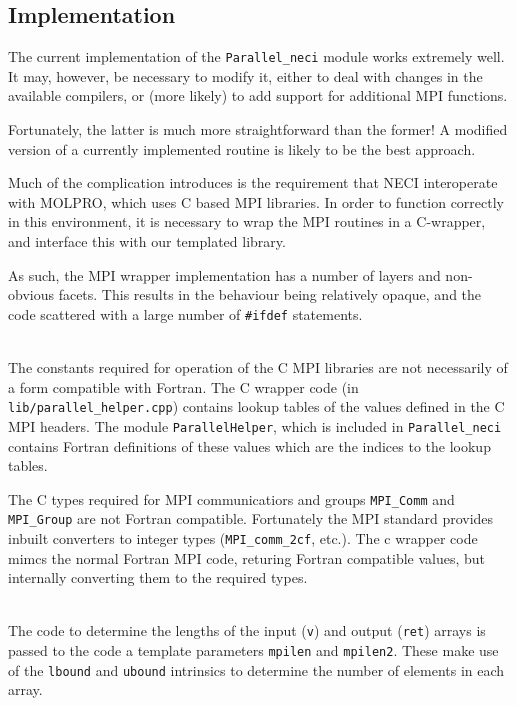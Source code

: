 \documentclass[a4paper,notitlepage]{scrreprt}
\newcommand\headitem[1]{\needspace{1.5\baselineskip}\item[{\boldmath #1 \nopagebreak}] \hfill \\ \nopagebreak}
\let\code\lstinline
\begin{document}
{{{\subsection{Implementation}
	The current implementation of the \code{Parallel_neci} module works
	extremely well. It may, however, be necessary to modify it, either to
	deal with changes in the available compilers, or (more likely) to add
	support for additional MPI functions.

	Fortunately, the latter is much more straightforward than the former!
	A modified version of a currently implemented routine is likely to be
	the best approach.

	Much of the complication introduces is the requirement that NECI
	interoperate with MOLPRO, which uses C based MPI libraries. In order
	to function correctly in this environment, it is necessary to wrap
	the MPI routines in a C-wrapper, and interface this with our
	templated library.

	As such, the MPI wrapper implementation has a number of layers and
	non-obvious facets. This results in the behaviour being relatively
	opaque, and the code scattered with a large number of \code{#ifdef}
	statements.
	\begin{description}
		\headitem{C-wrapper initialisation}
			The constants required for operation of the C MPI
			libraries are not necessarily of a form compatible with
			Fortran. The C wrapper code (in
			\code{lib/parallel_helper.cpp}) contains lookup tables of
			the values defined in the C MPI headers. The module
			\code{ParallelHelper}, which is included in
			\code{Parallel_neci} contains Fortran definitions of these
			values which are the indices to the lookup tables.

			The C types required for MPI communicatiors and groups
			\code{MPI_Comm} and \code{MPI_Group} are not Fortran
			compatible. Fortunately the MPI standard provides inbuilt
			converters to integer types (\code{MPI_comm_2cf}, etc.).
			The c wrapper code mimcs the normal Fortran MPI
			code, returing Fortran compatible values, but internally
			converting them to the required types.


		\headitem{Determination of parameter sizes}
			The code to determine the lengths of the input (\code{v})
			and output (\code{ret}) arrays is passed to the code a
			template parameters \code{mpilen} and \code{mpilen2}. These
			make use of the \code{lbound} and \code{ubound} intrinsics
			to determine the number of elements in each array.


\end{description}}}}
\end{document}
